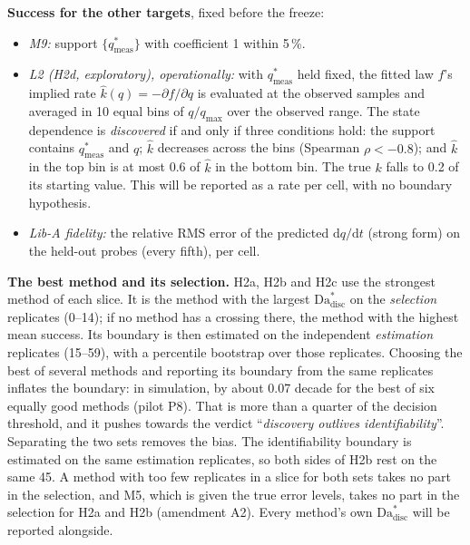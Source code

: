 \documentclass[11pt]{article}
\newcommand{\Da}{\mathrm{Da}}
\newcommand{\qsm}{q^{*}_{\mathrm{meas}}}
\newcommand{\verdict}[1]{``\textit{#1}''}
\begin{document}
\textbf{Success for the other targets}, fixed before the freeze:
\begin{itemize}
\item \emph{M9:} support $\{\qsm\}$ with coefficient 1 within 5\,\%.
\item \emph{L2 (H2d, exploratory), operationally:} with $\qsm$ held fixed, the fitted law
$f$'s implied rate $\hat k(q) = -\partial f/\partial q$ is evaluated at the observed samples
and averaged in 10 equal bins of $q/q_{\max}$ over the observed range. The state dependence
is \emph{discovered} if and only if three conditions hold: the support contains $\qsm$ and
$q$; $\hat k$ decreases across the bins (Spearman $\rho < -0.8$); and $\hat k$ in the top
bin is at most 0.6 of $\hat k$ in the bottom bin. The true $k$ falls to 0.2 of its starting
value. This will be reported as a rate per cell, with no boundary hypothesis.
\item \emph{Lib-A fidelity:} the relative RMS error of the predicted
$\mathrm{d}q/\mathrm{d}t$ (strong form) on the held-out probes (every fifth), per cell.
\end{itemize}

\textbf{The best method and its selection.} H2a, H2b and H2c use the strongest method of
each slice. It is the method with the largest $\Da^{*}_{\mathrm{disc}}$ on the
\emph{selection} replicates (0--14); if no method has a crossing there, the method with the
highest mean success. Its boundary is then estimated on the independent \emph{estimation}
replicates (15--59), with a percentile bootstrap over those replicates. Choosing the best of
several methods and reporting its boundary from the same replicates inflates the boundary:
in simulation, by about 0.07 decade for the best of six equally good methods (pilot P8).
That is more than a quarter of the decision threshold, and it pushes towards the verdict
\verdict{discovery outlives identifiability}. Separating the two sets removes the bias.
The identifiability boundary is estimated on the same estimation replicates, so both sides
of H2b rest on the same 45. A method with too few replicates in a slice for both sets takes
no part in the selection, and M5, which is given the true error levels, takes no part in
the selection for H2a and H2b (amendment A2). Every method's own $\Da^{*}_{\mathrm{disc}}$ will be reported
alongside.
\end{document}
